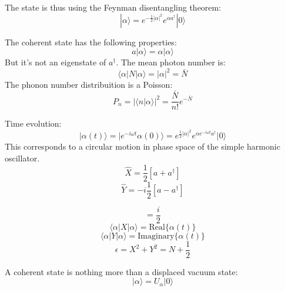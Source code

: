 \documentclass[12pt]{article}
\numberwithin{equation}{subsection}
\newcommand\page[1]{
{
}
}
\begin{document}
 The state is thus using the Feynman disentangling theorem:
 \begin{equation}
     |\alpha \rangle = e^{-\frac{1}{2}|\alpha|^2} e^{\alpha a^\dagger} | 0 \rangle
 \end{equation}
 
 The coherent state has the following properties:
 \begin{equation}
     a|\alpha\rangle = \alpha | \alpha \rangle 
 \end{equation}
 But it's not an eigenstate of $a^\dagger$. The mean photon number is:
 \begin{equation}
     \langle \alpha|N|\alpha\rangle = |\alpha|^2 = \bar N 
 \end{equation}
 The phonon number distribuition is a Poisson:
 \begin{equation}
     P_n = |\langle n | \alpha \rangle |^2 = \frac{\bar N}{n!} e^{-\bar N}
 \end{equation}
 \page{18}
Time evolution:
\begin{equation}
    |\alpha(t)\rangle  =|e^{-i\omega t}\alpha(0)\rangle =e^{\frac{1}{2}|\alpha|^2} e^{\alpha e^{-i\omega t} a^\dagger} |0\rangle 
\end{equation}
This corresponds to a circular motion in phase space of the simple harmonic oscillator.
\begin{equation}
    \hat X = \frac{1}{2} [a+a^\dagger]
\end{equation}
\begin{equation}
    \hat Y = -i\frac{1}{2} [a-a^\dagger]
\end{equation}

\begin{equation}
    [X,Y] = \frac{i}{2}
\end{equation}
\begin{equation}
\langle \alpha |X | \alpha \rangle = \textrm{Real}\{ \alpha(t)\}
\end{equation}
\begin{equation}
\langle \alpha |Y| \alpha \rangle = \textrm{Imaginary}\{\alpha(t)\}
\end{equation}
\begin{equation}
\epsilon = X^2+ Y^2 = N+ \frac{1}{2}
\end{equation}
\page{19}
A coherent state is nothing more than a displaced vacuum state:
\begin{equation}
    |\alpha\rangle = U_\alpha |0\rangle
\end{equation}
\end{document}
